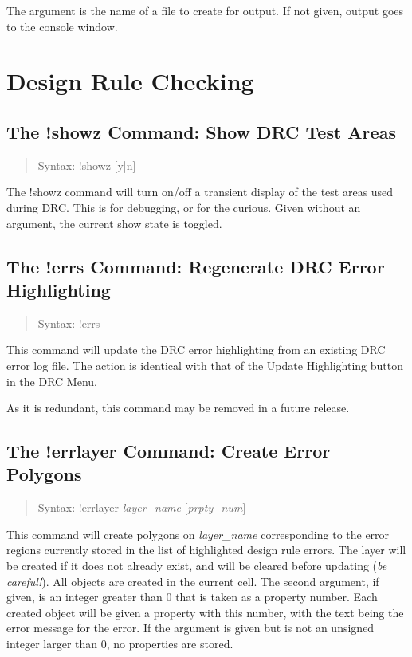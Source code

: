 The argument is the name of a file to create for output.  If not
given, output goes to the console window.


\section{Design Rule Checking}

\subsection{The {\cb !showz} Command: Show DRC Test Areas}
\begin{quote}
Syntax: {\vt !showz} [{\vt y|n}]
\end{quote}
The {\cb !showz} command will turn on/off a transient display of the
test areas used during DRC.  This is for debugging, or for the
curious.  Given without an argument, the current show state is
toggled.

\subsection{The {\cb !errs} Command: Regenerate DRC Error Highlighting}
\begin{quote}
Syntax: {\vt !errs}
\end{quote}
This command will update the DRC error highlighting from an existing
DRC error log file.  The action is identical with that of the {\cb
Update Highlighting} button in the {\cb DRC Menu}.

As it is redundant, this command may be removed in a future release.

\subsection{The {\cb !errlayer} Command: Create Error Polygons}
\begin{quote}
Syntax: {\vt !errlayer} {\it layer\_name} [{\it prpty\_num\/}]
\end{quote}
This command will create polygons on {\it layer\_name} corresponding
to the error regions currently stored in the list of highlighted
design rule errors.  The layer will be created if it does not already
exist, and will be cleared before updating ({\it be careful!\/}).  All
objects are created in the current cell.  The second argument, if
given, is an integer greater than 0 that is taken as a property
number.  Each created object will be given a property with this
number, with the text being the error message for the error.  If the
argument is given but is not an unsigned integer larger than 0, no
properties are stored.

